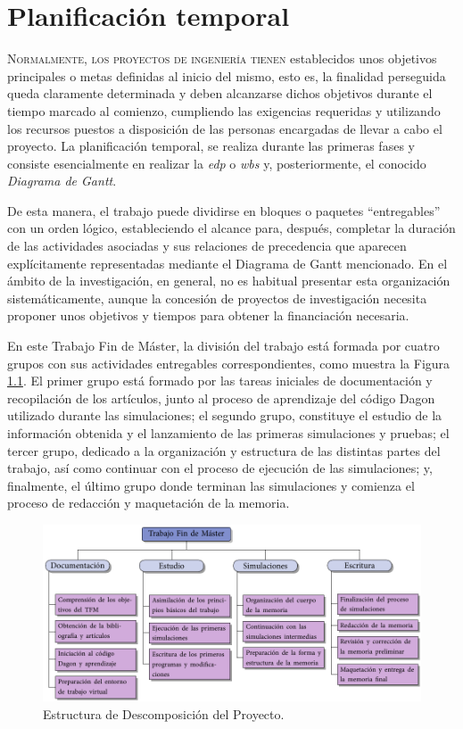 \chapter{Planificación temporal}\label{cap:9}
\lettrine{N}{ormalmente, los proyectos de ingeniería tienen} establecidos unos objetivos principales o metas definidas al inicio del mismo, esto es, la finalidad perseguida queda claramente determinada y deben alcanzarse dichos objetivos durante el tiempo marcado al comienzo, cumpliendo las exigencias requeridas y utilizando los recursos puestos a disposición de las personas encargadas de llevar a cabo el proyecto. La planificación temporal, se realiza durante las primeras fases y consiste esencialmente en realizar la \emph{\acrfull{edp}} o \emph{\acrfull{wbs}} y, posteriormente, el conocido \emph{Diagrama de Gantt}.

De esta manera, el trabajo puede dividirse en bloques o paquetes \enquote{entregables} con un orden lógico, estableciendo el alcance para, después, completar la duración de las actividades asociadas y sus relaciones de precedencia que aparecen explícitamente representadas mediante el Diagrama de Gantt mencionado. En el ámbito de la investigación, en general, no es habitual presentar esta organización sistemáticamente, aunque la concesión de proyectos de investigación necesita proponer unos objetivos y tiempos para obtener la financiación necesaria. 

En este Trabajo Fin de Máster, la división del trabajo está formada por cuatro grupos con sus actividades entregables correspondientes, como muestra la Figura \ref{fig:ch9_edp}. El primer grupo está formado por las tareas iniciales de documentación y recopilación de los artículos, junto al proceso de aprendizaje del código Dagon utilizado durante las simulaciones; el segundo grupo, constituye el estudio de la información obtenida y el lanzamiento de las primeras simulaciones y pruebas; el tercer grupo, dedicado a la organización y estructura de las distintas partes del trabajo, así como continuar con el proceso de ejecución de las simulaciones; y, finalmente, el último grupo donde terminan las simulaciones y comienza el proceso de redacción y maquetación de la memoria.

\begin{figure}[htbp]
  \centering
  \includegraphics[width=\textwidth]{Figuras/ch9_edp.pdf}
  \caption{Estructura de Descomposición del Proyecto.}
  \label{fig:ch9_edp}
\end{figure}

